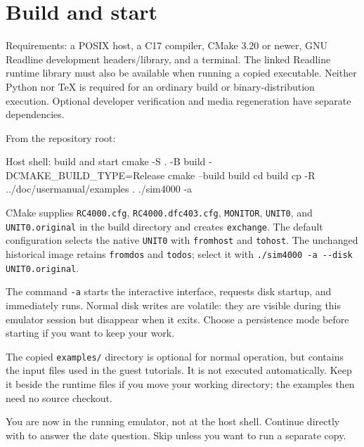 \chapter{Build and start}\label{build-and-start}

Requirements: a POSIX host, a C17 compiler, CMake 3.20 or newer, GNU Readline development headers/library, and a terminal. The linked Readline runtime library must also be available when running a copied executable. Neither Python nor TeX is required for an ordinary build or binary-distribution execution. Optional developer verification and media regeneration have separate dependencies.

From the repository root:

\begin{commandexample}[language=sh]{Host shell: build and start}
cmake -S . -B build -DCMAKE_BUILD_TYPE=Release
cmake --build build
cd build
cp -R ../doc/usermanual/examples .
./sim4000 -a
\end{commandexample}

CMake supplies \passthrough{\lstinline!RC4000.cfg!}, \passthrough{\lstinline!RC4000.dfc403.cfg!}, \passthrough{\lstinline!MONITOR!}, \passthrough{\lstinline!UNIT0!}, and \passthrough{\lstinline!UNIT0.original!} in the build directory and creates \passthrough{\lstinline!exchange!}. The default configuration selects the native \passthrough{\lstinline!UNIT0!} with \passthrough{\lstinline!fromhost!} and \passthrough{\lstinline!tohost!}. The unchanged historical image retains \passthrough{\lstinline!fromdos!} and \passthrough{\lstinline!todos!}; select it with \passthrough{\lstinline!./sim4000 -a --disk UNIT0.original!}.

The command \passthrough{\lstinline!-a!} starts the interactive interface, requests disk startup, and immediately runs. Normal disk writes are volatile: they are visible during this emulator session but disappear when it exits. Choose a persistence mode before starting if you want to keep your work.

The copied \texttt{examples/} directory is optional for normal operation, but
contains the input files used in the guest tutorials. It is not executed
automatically. Keep it beside the runtime files if you move your working
directory; the examples then need no source checkout.

You are now in the running emulator, not at the host shell. Continue directly
with  to answer the
date question. Skip  unless you want to run a separate copy.
